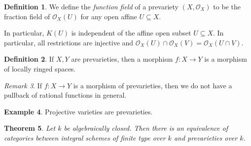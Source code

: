 \documentclass[leqno, openany]{memoir}
\newtheorem{thm}{Theorem}[section]
\theoremstyle{definition}
\newtheorem{defn}[thm]{Definition}
\newtheorem{exm}[thm]{Example}
\theoremstyle{remark}
\newtheorem{rmk}[thm]{Remark}
\theoremstyle{plain}
\theoremstyle{definition}
\theoremstyle{remark}
\newcommand{\mc}[1]{\mathcal{#1}}
\begin{document}
\begin{defn} We define the \textit{function field} of a prevariety $(X,
\mc{O}_X)$ to be the fraction field of $\mc{O}_X(U)$ for any open affine $U
\subseteq X$.  \end{defn}

In particular, $K(U)$ is independent of the affine open subset $U \subseteq X$.
In particular, all restrictions are injective and $\mc{O}_X(U) \cap \mc{O}_X(V)
= \mc{O}_X(U \cap V)$.

\begin{defn} If $X, Y$ are prevarieties, then a morphism $f \colon X \to Y$ is
a morphism of locally ringed spaces.  \end{defn}

\begin{rmk} If $f \colon X \to Y$ is a morphism of prevarieties, then we do not
have a pullback of rational functions in general.  \end{rmk}

\begin{exm} Projective varieties are prevarieties.  \end{exm}

\begin{thm} Let $k$ be algebraically closed. Then there is an equivalence of
categories between integral schemes of finite type over $k$ and prevarieties
over $k$.  \end{thm}
\end{document}
